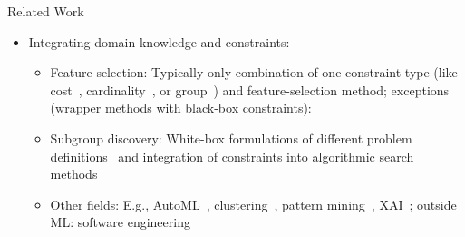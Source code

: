 \documentclass[en, navbarinline, handout]{sdqbeamer}
\begin{document}
\begin{frame}[t]{Related Work}
	\begin{itemize}
		\item Integrating domain knowledge and constraints:
		\begin{itemize}
			\item Feature selection: Typically only combination of one constraint type (like cost~\cite{paclik2002feature, plasberg2009feature}, cardinality~\cite{khushaba2011feature, yang2015budget}, or group~\cite{jacob2009group, yuan2006model}) and feature-selection method; exceptions (wrapper methods with black-box constraints):~\cite{groves2015toward, neutatz2021enforcing}
			\item Subgroup discovery: White-box formulations of different problem definitions~\cite{eckstein2002maximum, louveaux2014combinatorial} and integration of constraints into algorithmic search methods~\cite{atzmueller2005exploiting, meeng2021real}
			\item Other fields: E.g., AutoML~\cite{neutatz2023automl}, clustering~\cite{dao2024review}, pattern mining~\cite{silva2016constrained}, XAI~\cite{deutch2019constraints}; outside ML: software engineering~\cite{galindo2019automated}

\end{itemize}
\end{itemize}
\end{frame}
\end{document}

